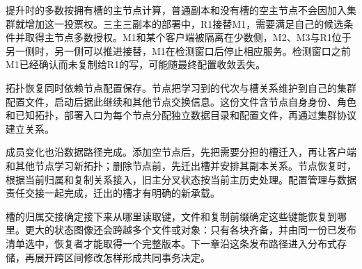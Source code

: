 提升时的多数按拥有槽的主节点计算，普通副本和没有槽的空主节点不会因加入集群就增加这一投票权。三主三副本的部署中，R1接替M1，需要满足自己的候选条件并取得主节点多数授权。M1和某个客户端被隔离在少数侧，M2、M3与R1位于另一侧时，另一侧可以推进接替，M1在检测窗口后停止相应服务。检测窗口之前M1已经确认而未复制给R1的写，可能随最终配置收敛丢失。


拓扑恢复同时依赖节点配置保存。节点把学习到的代次与槽关系维护到自己的集群配置文件，启动后据此继续和其他节点交换信息。这份文件含节点自身身份、角色和已知拓扑，部署入口为每个节点分配独立数据目录和配置文件，再通过集群协议建立关系。

成员变化也沿数据路径完成。添加空节点后，先把需要分担的槽迁入，再让客户端和其他节点学习新拓扑；删除节点前，先迁出槽并安排其副本关系。节点恢复时，根据当前归属和复制关系接入，旧主分叉状态按当前主历史处理。配置管理与数据责任交接一起完成，迁出的槽才有明确的新承载。

槽的归属交接确定接下来从哪里读取键，文件和复制前缀确定这些键能恢复到哪里。更大的状态图像还会跨越多个文件或对象：只有各块齐备，并由同一份已发布清单选中，恢复者才能取得一个完整版本。下一章沿这条发布路径进入分布式存储，再展开跨区间修改怎样形成共同事务决定。
\FloatBarrier
